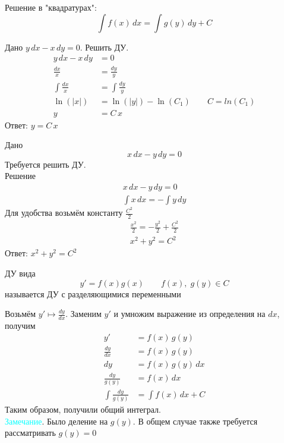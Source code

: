 \begin{Note}
    Решение в "квадратурах":
    \[
        \int f(x)\,dx = \int g(y)\,dy + C
    \]
\end{Note}

\begin{Example}
    Дано $y\,dx - x\,dy = 0$. Решить ДУ.
   \begin{align*}
        y\,dx - x\,dy &= 0 \\
        \frac{dx}{x} &= \frac{dy}{y}\\
        \int\frac{dx}{x} &= \int\frac{dy}{y}\\
        \ln(|x|) &= \ln(|y|) - \ln(C_1) \qquad C = ln(C_1)\\
        y &= C\,x
   \end{align*}
   Ответ: $y = C\,x$
\end{Example}
\begin{Example}
    Дано 
    \[
        x\,dx - y\,dy = 0
    \] 
    Требуется решить ДУ.\\
    Решение
    \begin{gather*}
        x\,dx - y\,dy = 0\\
        \int x\,dx = -\int y\,dy
    \end{gather*}
    Для удобства возьмём константу $\frac{C^2}{2}$
    \begin{gather*}
        \frac{x^2}{2} = -\frac{y^2}{2} + \frac{C^2}{2}\\
        x^2+y^2 = C^2
    \end{gather*}
    Ответ: $x^2+y^2 = C^2$
\end{Example}

\begin{Def}
    ДУ вида 
    \[
        y' = f(x)g(x) \qquad f(x),\; g(y) \in C
    \] 
    называется ДУ с разделяющимися переменными
\end{Def}

\begin{Note} 
     Возьмём $y' \mapsto \frac{dy}{dx}$. Заменим $y'$ и умножим выражение из определения на $dx$, получим
    \begin{align*}
        y' &= f(x)\,g(y)\\
        \frac{dy}{dx} &= f(x)\,g(y)\\
        dy &= f(x)\,g(y)\,dx\\
        \frac{dy}{g(y)} &= f(x)\,dx\\
        \int \frac{dy}{g(y)} &= \int f(x)\,dx + C
    \end{align*}
    Таким образом, получили общий интеграл.\\
    
    \textcolor{cyan}{Замечание}. Было деление на $g(y)$. В общем случае также требуется рассматривать $g(y) = 0$
\end{Note}

